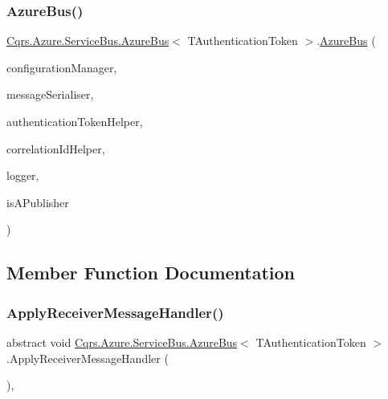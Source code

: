 \subsubsection{\texorpdfstring{Azure\+Bus()}{AzureBus()}}
{\footnotesize\ttfamily \hyperlink{classCqrs_1_1Azure_1_1ServiceBus_1_1AzureBus}{Cqrs.\+Azure.\+Service\+Bus.\+Azure\+Bus}$<$ T\+Authentication\+Token $>$.\hyperlink{classCqrs_1_1Azure_1_1ServiceBus_1_1AzureBus}{Azure\+Bus} (\begin{DoxyParamCaption}\item[{\hyperlink{interfaceCqrs_1_1Configuration_1_1IConfigurationManager}{I\+Configuration\+Manager}}]{configuration\+Manager,  }\item[{\hyperlink{interfaceCqrs_1_1Azure_1_1ServiceBus_1_1IMessageSerialiser}{I\+Message\+Serialiser}$<$ T\+Authentication\+Token $>$}]{message\+Serialiser,  }\item[{\hyperlink{interfaceCqrs_1_1Authentication_1_1IAuthenticationTokenHelper}{I\+Authentication\+Token\+Helper}$<$ T\+Authentication\+Token $>$}]{authentication\+Token\+Helper,  }\item[{I\+Correlation\+Id\+Helper}]{correlation\+Id\+Helper,  }\item[{I\+Logger}]{logger,  }\item[{bool}]{is\+A\+Publisher }\end{DoxyParamCaption})\hspace{0.3cm}{\ttfamily [protected]}}



\subsection{Member Function Documentation}
\mbox{\label{classCqrs_1_1Azure_1_1ServiceBus_1_1AzureBus_aad25a164e9e526c59d8ef98635c98095_aad25a164e9e526c59d8ef98635c98095}} 
\subsubsection{\texorpdfstring{Apply\+Receiver\+Message\+Handler()}{ApplyReceiverMessageHandler()}}
{\footnotesize\ttfamily abstract void \hyperlink{classCqrs_1_1Azure_1_1ServiceBus_1_1AzureBus}{Cqrs.\+Azure.\+Service\+Bus.\+Azure\+Bus}$<$ T\+Authentication\+Token $>$.Apply\+Receiver\+Message\+Handler (\begin{DoxyParamCaption}{ }\end{DoxyParamCaption})\hspace{0.3cm}{\ttfamily [protected]}, {}}



